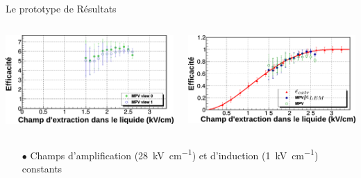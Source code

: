     \begin{frame}{Le prototype de \TOO{}}{Résultats}
        \begin{scriptsize}
            \begin{columns}
                \begin{column}{0.5\textwidth}
                    \includegraphics[width=\textwidth]{./pictures/gain_vs_extr.pdf}
                \end{column}
                \begin{column}{0.5\textwidth}
                    \includegraphics[width=\textwidth]{./pictures/comp_311_eff.pdf}
                \end{column}
            \end{columns}\vspace{0.5cm}
            \begin{columns}
                \begin{column}{0.5\textwidth}
                    \begin{itemize}
                        \item[$\bullet$] Champs d'amplification (\SI{28}{\kilo\volt\per\centi\meter}) et d'induction (\SI{1}{\kilo\volt\per\centi\meter}) constants

\end{itemize}
\end{column}
\end{columns}
\end{scriptsize}
\end{frame}

